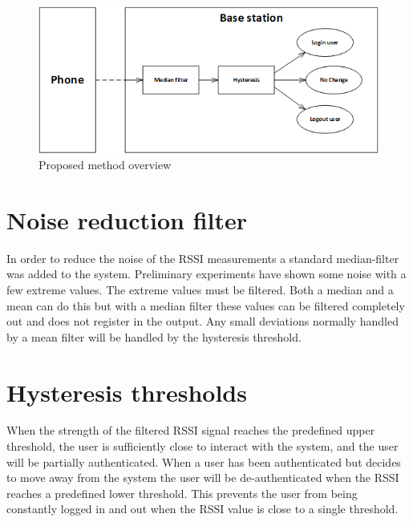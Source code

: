 \begin{figure}
	\centering
	\includegraphics[width=0.5\paperwidth]{img/SolutionOverview}
	\caption{ Proposed method overview }
	\label{fig_solution_overview}
\end{figure}



\section{Noise reduction filter}
In order to reduce the noise of the RSSI measurements a standard median-filter was added to the system.
Preliminary experiments have shown some noise with a few extreme values.
The extreme values must be filtered. Both a median and a mean can do this but with a median filter these values can be filtered completely out and does not register in the output. Any small deviations normally handled by a mean filter will be handled by the hysteresis threshold.

\section{Hysteresis thresholds}
When the strength of the filtered RSSI signal reaches the predefined upper threshold, the user is sufficiently close to interact with the system, and the user will be partially authenticated.
When a user has been authenticated but decides to move away from the system the user will be de-authenticated when the RSSI reaches a predefined lower threshold.
This prevents the user from being constantly logged in and out when the RSSI value is close to a single threshold.
